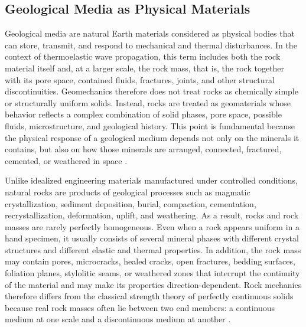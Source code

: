 \subsection{Geological Media as Physical Materials}

Geological media are natural Earth materials considered as physical bodies that can store, transmit, and respond to mechanical and thermal disturbances. In the context of thermoelastic wave propagation, this term includes both the rock material itself and, at a larger scale, the rock mass, that is, the rock together with its pore space, contained fluids, fractures, joints, and other structural discontinuities. Geomechanics therefore does not treat rocks as chemically simple or structurally uniform solids. Instead, rocks are treated as geomaterials whose behavior reflects a complex combination of solid phases, pore space, possible fluids, microstructure, and geological history. This point is fundamental because the physical response of a geological medium depends not only on the minerals it contains, but also on how those minerals are arranged, connected, fractured, cemented, or weathered in space \cite{jaeger2007,mavko2009,robertson1988}.

Unlike idealized engineering materials manufactured under controlled conditions, natural rocks are products of geological processes such as magmatic crystallization, sediment deposition, burial, compaction, cementation, recrystallization, deformation, uplift, and weathering. As a result, rocks and rock masses are rarely perfectly homogeneous. Even when a rock appears uniform in a hand specimen, it usually consists of several mineral phases with different crystal structures and different elastic and thermal properties. In addition, the rock mass may contain pores, microcracks, healed cracks, open fractures, bedding surfaces, foliation planes, stylolitic seams, or weathered zones that interrupt the continuity of the material and may make its properties direction-dependent. Rock mechanics therefore differs from the classical strength theory of perfectly continuous solids because real rock masses often lie between two end members: a continuous medium at one scale and a discontinuous medium at another \cite{jaeger2007,schultz2019}.

